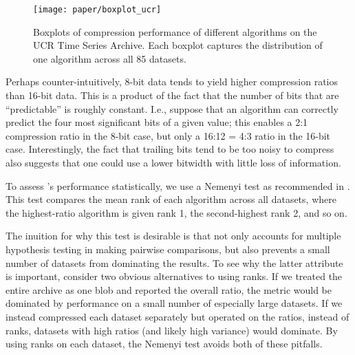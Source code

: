 \begin{figure}[h]
\begin{center}
    \texttt{[image: paper/boxplot\_ucr]}
    \caption{Boxplots of compression performance of different algorithms on the UCR Time Series Archive. Each boxplot captures the distribution of one algorithm across all 85 datasets.}
    \label{fig:ratioBox}
\end{center}
\end{figure}

Perhaps counter-intuitively, 8-bit data tends to yield higher compression ratios than 16-bit data. This is a product of the fact that the number of bits that are ``predictable'' is roughly constant. I.e., suppose that an algorithm can correctly predict the four most significant bits of a given value; this enables a 2:1 compression ratio in the 8-bit case, but only a 16:12 = 4:3 ratio in the 16-bit case. Interestingly, the fact that trailing bits tend to be too noisy to compress also suggests that one could use a lower bitwidth with little loss of information. %

To assess \mine's performance statistically, we use a Nemenyi test \cite{nemenyiTest} as recommended in \cite{cdDiagrams}. This test compares the mean rank of each algorithm across all datasets, where the highest-ratio algorithm is given rank 1, the second-highest rank 2, and so on.

The inuition for why this test is desirable is that not only accounts for multiple hypothesis testing in making pairwise comparisons, but also prevents a small number of datasets from dominating the results. To see why the latter attribute is important, consider two obvious alternatives to using ranks. If we treated the entire archive as one blob and reported the overall ratio, the metric would be dominated by performance on a small number of especially large datasets. If we instead compressed each dataset separately but operated on the ratios, instead of ranks, datasets with high ratios (and likely high variance) would dominate. By using ranks on each dataset, the Nemenyi test avoids both of these pitfalls.



